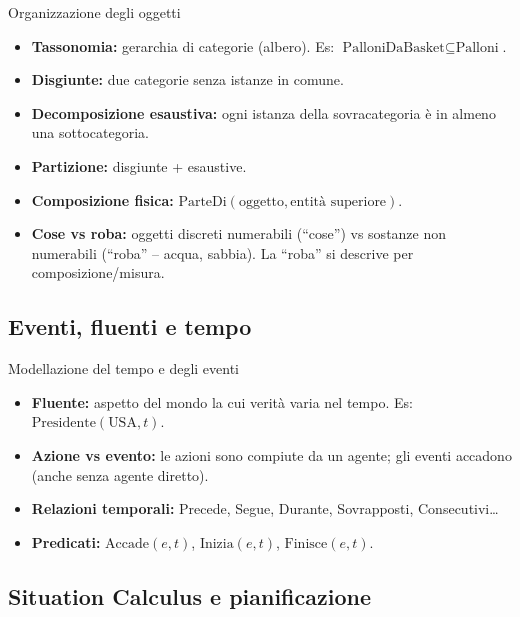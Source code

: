 \documentclass[12pt,a4paper]{article}
\begin{document}
\begin{defbox}{Organizzazione degli oggetti}
\begin{itemize}[noitemsep]
  \item \textbf{Tassonomia:} gerarchia di categorie (albero). Es: $\text{PalloniDaBasket} \subseteq \text{Palloni}$.
  \item \textbf{Disgiunte:} due categorie senza istanze in comune.
  \item \textbf{Decomposizione esaustiva:} ogni istanza della sovracategoria è in almeno una sottocategoria.
  \item \textbf{Partizione:} disgiunte + esaustive.
  \item \textbf{Composizione fisica:} $\text{ParteDi}(\text{oggetto}, \text{entità superiore})$.
  \item \textbf{Cose vs roba:} oggetti discreti numerabili (``cose'') vs sostanze non numerabili (``roba'' -- acqua, sabbia). La ``roba'' si descrive per composizione/misura.
\end{itemize}
\end{defbox}

\subsection{Eventi{,} fluenti e tempo}

\begin{defbox}{Modellazione del tempo e degli eventi}
\begin{itemize}[noitemsep]
  \item \textbf{Fluente:} aspetto del mondo la cui verità varia nel tempo. Es: $\text{Presidente}(\text{USA}, t)$.
  \item \textbf{Azione vs evento:} le azioni sono compiute da un agente; gli eventi accadono (anche senza agente diretto).
  \item \textbf{Relazioni temporali:} Precede, Segue, Durante, Sovrapposti, Consecutivi\ldots
  \item \textbf{Predicati:} $\text{Accade}(e, t)$, $\text{Inizia}(e, t)$, $\text{Finisce}(e, t)$.
\end{itemize}
\end{defbox}

\subsection{Situation Calculus e pianificazione}
\end{document}
